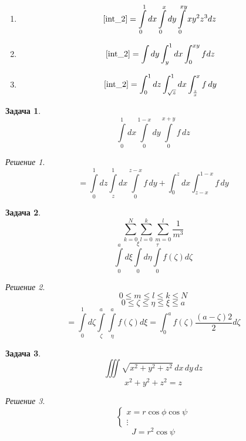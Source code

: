 \documentclass[english]{article}
\theoremstyle{plain}
\theoremstyle{remark}
\newtheorem*{solution}{Решение}
\theoremstyle{definition}
\newtheorem{task}{Задача}
\begin{document}
\begin{enumerate}
\item \[ \ref{int_2} = \int\limits_0^1 dx \int\limits_0^x dy \int\limits_0^{xy} x y^2 z^3 dz \]
\item \[ \ref{int_2} = \int dy \int_y^1 dx \int_0^{xy} f dz\]
\item \[ \ref{int_2} = \int_0^1 dz \int_{\sqrt{z}}^1 dx \int_{\frac{z}{x}}^x f\,dy \]
\end{enumerate}
\begin{task}
\[ \int\limits_0^1 dx \int\limits_0^{1 - x}dy\int\limits_0^{x + y} f\, dz \]
\end{task}
\begin{solution}
\[ = \int\limits_0^1 dz \int\limits_z^1 dx \int\limits_0^{z - x} f\, dy + \int_0^z dx \int_{z - x}^{1 - x} f\, dy \]
\end{solution}

\begin{task}
\[ \sum_{k = 0}^N\sum_{l = 0}^k\sum_{m = 0}^l \frac{1}{m^3} \]
\[ \int\limits_0^a d\xi \int\limits_0^\xi d\eta \int\limits_0^\tau f(\zeta) d\zeta \]
\end{task}
\begin{solution}
\[ 0 \le m \le l \le k \le N \]
\[ 0 \le \zeta \le \eta \le \xi \le a \]
\[ = \int\limits_0^1 d\zeta \int\limits_\zeta^a \int\limits_\eta^a f(\zeta) d\xi = \int_0^a f(\zeta) \frac{(a - \zeta)2}{2} d\zeta \]
\end{solution}

\begin{task}
\[ \iiint \sqrt{x^2 + y^2 + z^2}\,dx\,dy\,dz \]
\[ x^2 + y^2 + z^2 = z \]
\end{task}
\begin{solution}
\[ \begin{cases}
x = r \cos\phi \cos\psi \\
\vdots
\end{cases} \]
\[ J = r^2\cos\psi \]
\end{solution}
\end{document}
